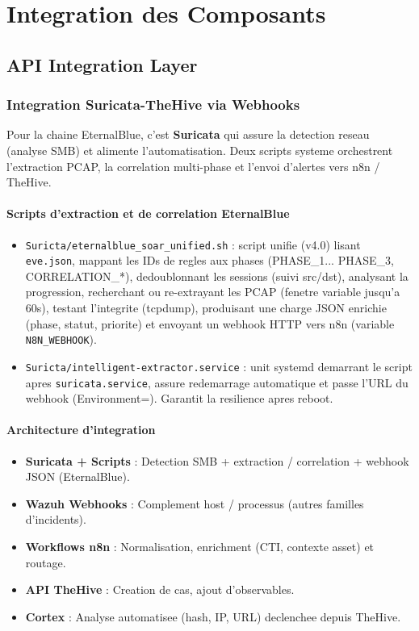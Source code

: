 \section{Integration des Composants}

\subsection{API Integration Layer}

\subsubsection{Integration Suricata-TheHive via Webhooks}

Pour la chaine EternalBlue, c'est \textbf{Suricata} qui assure la detection reseau (analyse SMB) et alimente l'automatisation. Deux scripts systeme orchestrent l'extraction PCAP, la correlation multi-phase et l'envoi d'alertes vers n8n / TheHive.

\paragraph{Scripts d'extraction et de correlation EternalBlue}
\begin{itemize}
    \item \texttt{Suricta/eternalblue\_soar\_unified.sh} : script unifie (v4.0) lisant \texttt{eve.json}, mappant les IDs de regles aux phases (PHASE\_1... PHASE\_3, CORRELATION\_*), dedoublonnant les sessions (suivi src/dst), analysant la progression, recherchant ou re-extrayant les PCAP (fenetre variable jusqu'a 60s), testant l'integrite (tcpdump), produisant une charge JSON enrichie (phase, statut, priorite) et envoyant un webhook HTTP vers n8n (variable \texttt{N8N\_WEBHOOK}).
    \item \texttt{Suricta/intelligent-extractor.service} : unit systemd demarrant le script apres \texttt{suricata.service}, assure redemarrage automatique et passe l'URL du webhook (Environment=). Garantit la resilience apres reboot.
\end{itemize}

\paragraph{Architecture d'integration}
\begin{itemize}
    \item \textbf{Suricata + Scripts} : Detection SMB + extraction / correlation + webhook JSON (EternalBlue).
    \item \textbf{Wazuh Webhooks} : Complement host / processus (autres familles d'incidents).
    \item \textbf{Workflows n8n} : Normalisation, enrichment (CTI, contexte asset) et routage.
    \item \textbf{API TheHive} : Creation de cas, ajout d'observables.
    \item \textbf{Cortex} : Analyse automatisee (hash, IP, URL) declenchee depuis TheHive.
\end{itemize}


